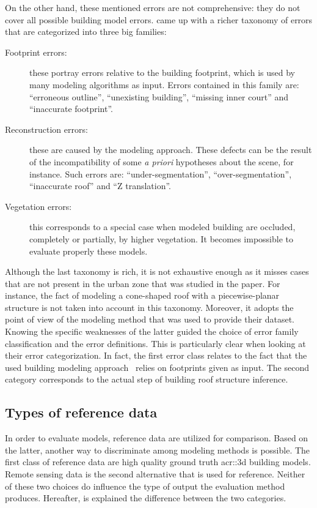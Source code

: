             On the other hand, these mentioned errors are not comprehensive: they do not cover all possible building model errors.
            \textcite{michelin2013quality} came up with a richer taxonomy of errors that are categorized into three big families:
            \begin{description}
                \item[Footprint errors:] these portray errors relative to the building footprint, which is used by many modeling algorithms as input.
                        Errors contained in this family are: ``erroneous outline'', ``unexisting building'', ``missing inner court'' and ``inaccurate footprint''.
                \item[Reconstruction errors:] these are caused by the modeling approach.
                        These defects can be the result of the incompatibility of some \textit{a priori} hypotheses about the scene, for instance.
                        Such errors are: ``under-segmentation'', ``over-segmentation'', ``inaccurate roof'' and ``Z translation''.
                \item[Vegetation errors:] this corresponds to a special case when modeled building are occluded, completely or partially, by higher vegetation.
                        It becomes impossible to evaluate properly these models.
            \end{description}
            Although the last taxonomy is rich, it is not exhaustive enough as it misses cases that are not present in the urban zone that was studied in the paper.
            For instance, the fact of modeling a cone-shaped roof with a piecewise-planar structure is not taken into account in this taxonomy.
            Moreover, it adopts the point of view of the modeling method that was used to provide their dataset.
            Knowing the specific weaknesses of the latter guided the choice of error family classification and the error definitions.
            This is particularly clear when looking at their error categorization.
            In fact, the first error class relates to the fact that the used building modeling approach~\parencite{durupt2006automatic} relies on footprints given as input.
            The second category corresponds to the actual step of building roof structure inference.

    \subsection{Types of reference data}
        \label{subsec::state_of_the_art::quality::reference}
        In order to evaluate models, reference data are utilized for comparison.
        Based on the latter, another way to discriminate among modeling methods is possible.
        The first class of reference data are high quality ground truth \gls{acr::3d} building models.
        Remote sensing data is the second alternative that is used for reference.
        Neither of these two choices do influence the type of output the evaluation method produces.
        Hereafter, is explained the difference between the two categories.

